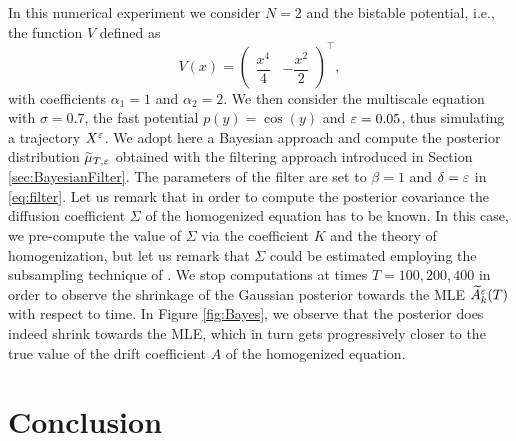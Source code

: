 \documentclass[10pt]{article}
\begin{document}
In this numerical experiment we consider $N = 2$ and the bistable potential, i.e., the function $V$ defined as
\begin{equation}
	V(x) = \begin{pmatrix} \dfrac{x^4}{4} & -\dfrac{x^2}{2} \end{pmatrix}^\top,
\end{equation}
with coefficients $\alpha_1 = 1$ and $\alpha_2 = 2$. We then consider the multiscale equation with $\sigma = 0.7$, the fast potential $p(y) = \cos(y)$ and $\varepsilon = 0.05$, thus simulating a trajectory $X^\varepsilon$. We adopt here a Bayesian approach and compute the posterior distribution $\widetilde \mu_{T, \varepsilon}$ obtained with the filtering approach introduced in Section \ref{sec:BayesianFilter}. The parameters of the filter are set to $\beta = 1$ and $\delta = \varepsilon$ in \eqref{eq:filter}. Let us remark that in order to compute the posterior covariance the diffusion coefficient $\Sigma$ of the homogenized equation has to be known. In this case, we pre-compute the value of $\Sigma$ via the coefficient $K$ and the theory of homogenization, but let us remark that $\Sigma$ could be estimated employing the subsampling technique of \cite{PaS07}. We stop computations at times $T = 100, 200, 400$ in order to observe the shrinkage of the Gaussian posterior towards the MLE $\widetilde A^\varepsilon_k(T)$ with respect to time. In Figure \ref{fig:Bayes}, we observe that the posterior does indeed shrink towards the MLE, which in turn gets progressively closer to the true value of the drift coefficient $A$ of the homogenized equation.

\section{Conclusion}
\end{document}
